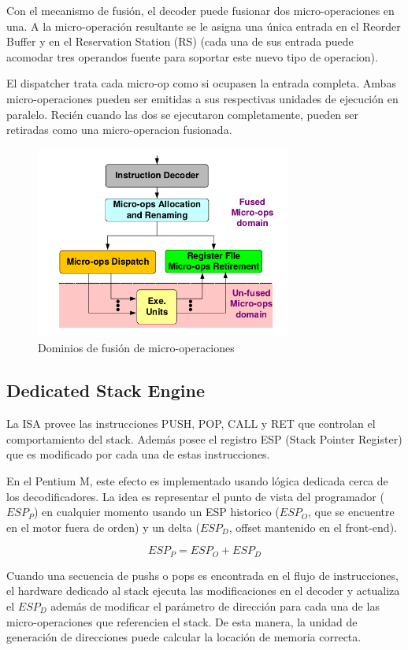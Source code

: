 Con el mecanismo de fusión, el decoder puede fusionar dos micro-operaciones en una. A la micro-operación resultante se le asigna una única entrada en el Reorder Buffer y en el Reservation Station (RS) (cada una de sus entrada puede acomodar tres operandos fuente para soportar este nuevo tipo de operacion). 

El dispatcher trata cada micro-op como si ocupasen la entrada completa. Ambas micro-operaciones pueden ser emitidas a sus respectivas unidades de ejecución en paralelo. Recién cuando las dos se ejecutaron completamente, pueden ser retiradas como una micro-operacion fusionada.

\begin{figure}[ht]
	\centering
	\includegraphics[width=0.75\textwidth]{imagenes/micro-op-fusion}
	\caption{Dominios de fusión de micro-operaciones}
	\label{fig:MicroOpFusion}
\end{figure}

\subsection{Dedicated Stack Engine}
La ISA provee las instrucciones PUSH, POP, CALL y RET que controlan el comportamiento del stack. Además posee el registro ESP (Stack Pointer Register) que es modificado por cada una de estas instrucciones.

En el Pentium M, este efecto es implementado usando lógica dedicada cerca de los decodificadores. La idea es representar el punto de vista del programador ($ESP_P$) en cualquier momento usando un ESP historico ($ESP_O$, que se encuentre en el motor fuera de orden) y un delta ($ESP_D$, offset mantenido en el front-end).

$$ESP_P = ESP_O + ESP_D$$

Cuando una secuencia de pushs o pops es encontrada en el flujo de instrucciones, el hardware dedicado al stack ejecuta las modificaciones en el decoder y actualiza el $ESP_D$ además de modificar el parámetro de dirección para cada una de las micro-operaciones que referencien el stack. De esta manera, la unidad de generación de direcciones puede calcular la locación de memoria correcta.

